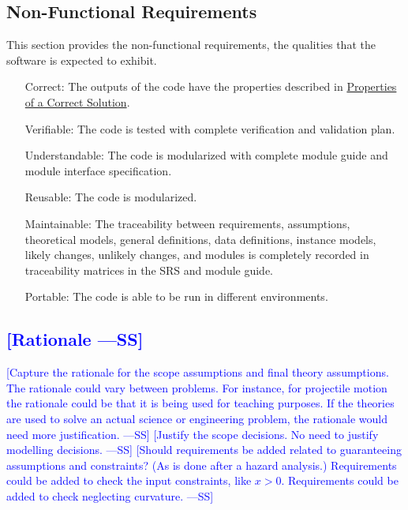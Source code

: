 \documentclass[12pt]{article}
\newcommand{\authornote}[3]{\textcolor{#1}{[#3 ---#2]}}
\newcommand{\authornote}[3]{}
\newcommand{\wss}[1]{\authornote{blue}{SS}{#1}}
\begin{document}
\subsection{Non-Functional Requirements}
\label{Sec:NFRs}
This section provides the non-functional requirements, the qualities that the software is expected to exhibit.

\begin{itemize}
\item[Correct:\phantomsection\label{correct}]{The outputs of the code have the properties described in \hyperref[Sec:CorSolProps]{Properties of a Correct Solution}.}
\item[Verifiable:\phantomsection\label{verifiable}]{The code is tested with complete verification and validation plan.}
\item[Understandable:\phantomsection\label{understandable}]{The code is modularized with complete module guide and module interface specification.}
\item[Reusable:\phantomsection\label{reusable}]{The code is modularized.}
\item[Maintainable:\phantomsection\label{maintainable}]{The traceability between requirements, assumptions, theoretical models, general definitions, data definitions, instance models, likely changes, unlikely changes, and modules is completely recorded in traceability matrices in the SRS and module guide.}
\item[Portable:\phantomsection\label{portable}]{The code is able to be run in different environments.}
\end{itemize}

\subsection{\wss{Rationale}} \label{Sec:Rationale}
\wss{Capture the rationale for the scope assumptions and final theory
assumptions.  The rationale could vary between problems.  For instance, for
projectile motion the rationale could be that it is being used for teaching
purposes.  If the theories are used to solve an actual science or engineering
problem, the rationale would need more justification.}
\wss{Justify the scope decisions.  No need to justify modelling decisions.}
\wss{Should requirements be added related to guaranteeing assumptions and
constraints?  (As is done after a hazard analysis.)  Requirements could be added
to check the input constraints, like $x > 0$. Requirements could be added to
check neglecting curvature.}
\end{document}
